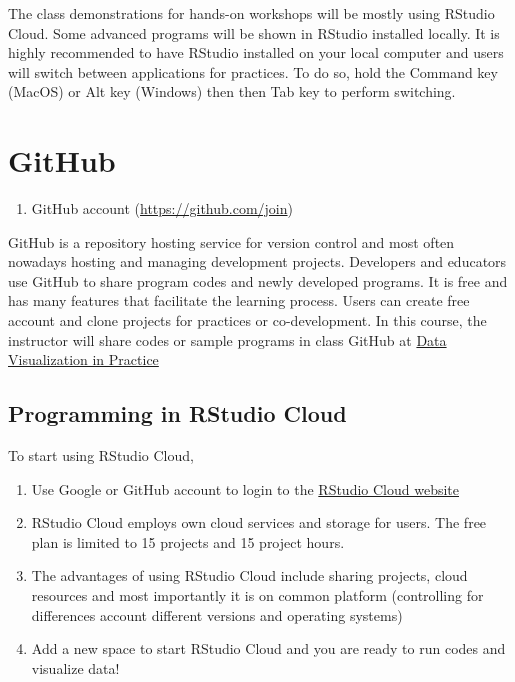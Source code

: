\documentclass[
]{book}
\providecommand{\tightlist}{%
  \setlength{\itemsep}{0pt}\setlength{\parskip}{0pt}}
\begin{document}
The class demonstrations for hands-on workshops will be mostly using RStudio Cloud. Some advanced programs will be shown in RStudio installed locally. It is highly recommended to have RStudio installed on your local computer and users will switch between applications for practices. To do so, hold the Command key (MacOS) or Alt key (Windows) then then Tab key to perform switching.

\hypertarget{github}{%
\section{GitHub}\label{github}}

\begin{enumerate}
\def\labelenumi{\arabic{enumi}.}
\tightlist
\item
  GitHub account (\url{https://github.com/join})
\end{enumerate}

GitHub is a repository hosting service for version control and most often nowadays hosting and managing development projects. Developers and educators use GitHub to share program codes and newly developed programs. It is free and has many features that facilitate the learning process. Users can create free account and clone projects for practices or co-development. In this course, the instructor will share codes or sample programs in class GitHub at \href{https://www.github.com/datageneration/datavisualizationinpractice}{Data Visualization in Practice}

\hypertarget{programming-in-rstudio-cloud}{%
\subsection{Programming in RStudio Cloud}\label{programming-in-rstudio-cloud}}

To start using RStudio Cloud,

\begin{enumerate}
\def\labelenumi{\arabic{enumi}.}
\tightlist
\item
  Use Google or GitHub account to login to the \href{http://Rstudio.cloud}{RStudio Cloud website}
\item
  RStudio Cloud employs own cloud services and storage for users. The free plan is limited to 15 projects and 15 project hours.
\item
  The advantages of using RStudio Cloud include sharing projects, cloud resources and most importantly it is on common platform (controlling for differences account different versions and operating systems)
\item
  Add a new space to start RStudio Cloud and you are ready to run codes and visualize data!
\end{enumerate}
\end{document}
